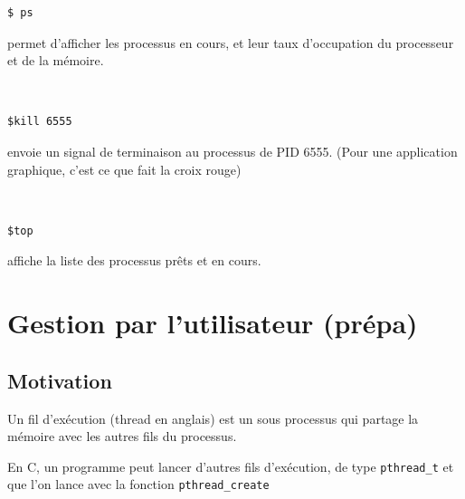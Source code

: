 \noindent \begin{minipage}{0.3\linewidth}
	\begin{lstlisting}
$ ps
	\end{lstlisting}
\end{minipage}\quad\begin{minipage}{0.6\linewidth}
	permet d'afficher les processus en cours, et leur taux d'occupation du processeur et de la mémoire. 
\end{minipage}\\

\noindent \begin{minipage}{0.3\linewidth}
	\begin{lstlisting}
$kill 6555
	\end{lstlisting}
\end{minipage}\quad\begin{minipage}{0.6\linewidth}
	envoie un  signal de terminaison au processus de PID 6555. (Pour une application graphique, c'est ce que fait la croix rouge)
\end{minipage}\\

\noindent \begin{minipage}{0.3\linewidth}
	\begin{lstlisting}
$top
	\end{lstlisting}
\end{minipage}\quad\begin{minipage}{0.6\linewidth}
	affiche la liste des processus prêts et en cours.
\end{minipage}

\section{Gestion par l'utilisateur (prépa)}

\subsection{Motivation}

\begin{definition}
	Un fil d'exécution (thread en anglais) est un sous processus qui partage la mémoire avec les autres fils du processus.
\end{definition}

\begin{impl}
	En C, un programme peut lancer d'autres fils d'exécution, de type \texttt{pthread\_t} et que l'on lance avec la fonction \texttt{pthread\_create}
\end{impl}

